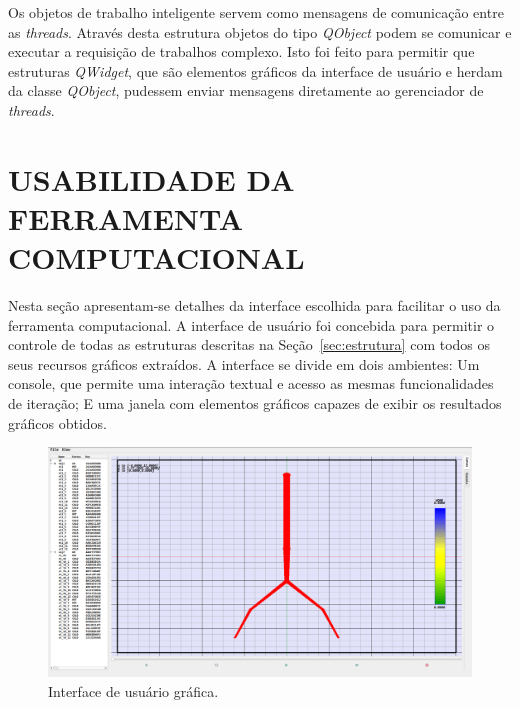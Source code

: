 
Os objetos de trabalho inteligente servem como mensagens de comunicação entre as \textit{threads}. Através desta estrutura objetos do tipo \textit{QObject} podem se comunicar e executar a requisição de trabalhos complexo. Isto foi feito para permitir que estruturas \textit{QWidget}, que são elementos gráficos da interface de usuário e herdam da classe \textit{QObject}, pudessem enviar mensagens diretamente ao gerenciador de \textit{threads}. 

\chapter{USABILIDADE DA FERRAMENTA COMPUTACIONAL}\label{sec:userinterface}

Nesta seção apresentam-se detalhes da interface escolhida para facilitar o uso da ferramenta computacional. A interface de usuário foi concebida para permitir o controle de todas as estruturas descritas na Seção~\ref{sec:estrutura} com todos os seus recursos gráficos extraídos. A interface se divide em dois ambientes: Um console, que permite uma interação textual e acesso as mesmas funcionalidades de iteração; E uma janela com elementos gráficos capazes de exibir os resultados gráficos obtidos. 

\begin{figure}[!htbp]
	\centering
	\includegraphics[width=\linewidth]{Figures/IGU_002.png}
	\caption{Interface de usuário gráfica.}
	\label{fig10:UI}
\end{figure}

